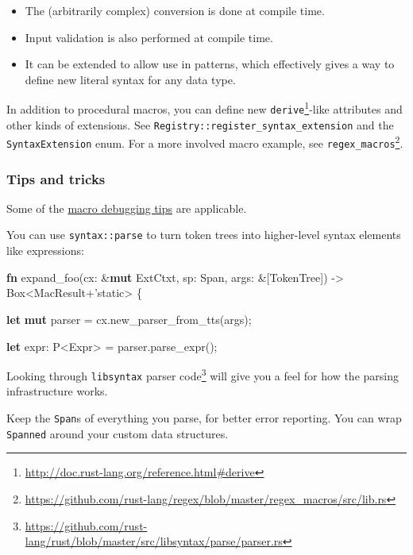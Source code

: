 \documentclass[a4paper,]{book}
\newenvironment{Shaded}{\begin{snugshade}}{\end{snugshade}}
\newcommand{\KeywordTok}[1]{\textcolor[rgb]{0.13,0.29,0.53}{\textbf{{#1}}}}
\newcommand{\DataTypeTok}[1]{\textcolor[rgb]{0.13,0.29,0.53}{{#1}}}
\newcommand{\OtherTok}[1]{\textcolor[rgb]{0.56,0.35,0.01}{{#1}}}
\newcommand{\NormalTok}[1]{{#1}}
\renewcommand{\href}[2]{#2\footnote{\url{#1}}}
\providecommand{\tightlist}{%
  \setlength{\itemsep}{0pt}\setlength{\parskip}{0pt}}
\begin{document}
\begin{itemize}
\tightlist
\item
  The (arbitrarily complex) conversion is done at compile time.
\item
  Input validation is also performed at compile time.
\item
  It can be extended to allow use in patterns, which effectively gives a
  way to define new literal syntax for any data type.
\end{itemize}

In addition to procedural macros, you can define new
\href{http://doc.rust-lang.org/reference.html\#derive}{\texttt{derive}}-like
attributes and other kinds of extensions. See
\texttt{Registry::register\_syntax\_extension} and the
\texttt{SyntaxExtension} enum. For a more involved macro example, see
\href{https://github.com/rust-lang/regex/blob/master/regex_macros/src/lib.rs}{\texttt{regex\_macros}}.

\subsubsection{Tips and tricks}\label{tips-and-tricks}

Some of the \protect\hyperlink{debugging-macro-code}{macro debugging
tips} are applicable.

You can use \texttt{syntax::parse} to turn token trees into higher-level
syntax elements like expressions:

\begin{Shaded}
\begin{Highlighting}[]
\KeywordTok{fn} \NormalTok{expand_foo(cx: &}\KeywordTok{mut} \NormalTok{ExtCtxt, sp: Span, args: &[TokenTree])}
        \NormalTok{-> }\DataTypeTok{Box}\NormalTok{<MacResult+}\OtherTok{'static}\NormalTok{> \{}

    \KeywordTok{let} \KeywordTok{mut} \NormalTok{parser = cx.new_parser_from_tts(args);}

    \KeywordTok{let} \NormalTok{expr: P<Expr> = parser.parse_expr();}
\end{Highlighting}
\end{Shaded}

Looking through
\href{https://github.com/rust-lang/rust/blob/master/src/libsyntax/parse/parser.rs}{\texttt{libsyntax}
parser code} will give you a feel for how the parsing infrastructure
works.

Keep the \texttt{Span}s of everything you parse, for better error
reporting. You can wrap \texttt{Spanned} around your custom data
structures.
\end{document}

